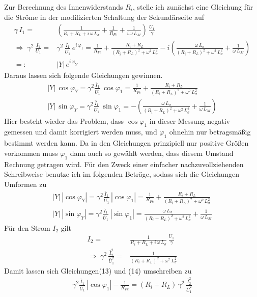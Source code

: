 \documentclass[a4paper, 12pt,]{scrartcl}
\begin{document}
Zur Berechnung des Innenwiderstands $R_i$, stelle ich zunächst eine Gleichung für die Ströme in der modifizierten Schaltung der Sekundärseite auf
\begin{align*}\gamma\,I_1=&\left(\frac{1}{R_i+R_L+i\,\omega\,L_\sigma}+\frac{1}{R_{Fe}}+\frac{1}{i\,\omega\,L_M}\right)\,\frac{U_1}{\gamma}\\
\Rightarrow\;\gamma^2\,\frac{I_1}{U_1}=&\gamma^2\,\frac{\bar{I}_1}{\bar{U}_1}\,e^{i\,\varphi_1}=\frac{1}{R_{Fe}}+\frac{R_i+R_L}{(R_i+R_L)^2+\omega^2\,L_\sigma^2}-i\left(\frac{\omega\,L_\sigma}{(R_i+R_L)^2+\omega^2\,L_\sigma^2}+\frac{1}{\omega\,L_M}\right)\\=:&|Y|\,e^{i\,\varphi_Y}\end{align*}
Daraus lassen sich folgende Gleichungen gewinnen.
\begin{align*}
|Y|\,\cos\varphi_Y=\gamma^2\frac{\bar{I}_1}{\bar{U}_1}\,\cos\varphi_1=\frac{1}{R_{Fe}}+\frac{R_i+R_L}{(R_i+R_L)^2+\omega^2\,L_\sigma^2}\\
|Y|\,\sin\varphi_Y=\gamma^2\frac{\bar{I}_1}{\bar{U}_1}\,\sin\varphi_1=-\left(\frac{\omega\,L_\sigma}{(R_i+R_L)^2+\omega^2\,L_\sigma^2}+\frac{1}{\omega\,L_M}\right)
\end{align*}
Hier besteht wieder das Problem, dass $\cos\varphi_1$ in dieser Messung negativ gemessen und damit korrigiert werden muss, und $\varphi_1$ ohnehin nur betragsmäßig bestimmt werden kann. Da in den Gleichungen prinzipiell nur positive Größen vorkommen muss $\varphi_1$ dann auch so gewählt werden, dass diesem Umstand Rechnung getragen wird. Für den Zweck einer einfacher nachzuvollziehenden Schreibweise benutze ich im folgenden Beträge, sodass sich die Gleichungen Umformen zu
\begin{align}
|Y|\,|\cos\varphi_Y|=\gamma^2\frac{\bar{I}_1}{\bar{U}_1}\,|\cos\varphi_1|=\frac{1}{R_{Fe}}+\frac{R_i+R_L}{(R_i+R_L)^2+\omega^2\,L_\sigma^2}\\
|Y|\,|\sin\varphi_Y|=\gamma^2\frac{\bar{I}_1}{\bar{U}_1}\,|\sin\varphi_1|=\frac{\omega\,L_\sigma}{(R_i+R_L)^2+\omega^2\,L_\sigma^2}+\frac{1}{\omega\,L_M}
\end{align}
Für den Strom $I_2$ gilt
\begin{align*}I_2=&\frac{1}{R_i+R_L+i\,\omega\,L_\sigma}\,\frac{U_1}{\gamma}\\
\Rightarrow\;\gamma^2\,\frac{\bar{I}_2^2}{\bar{U}_1^2}=&\frac{1}{(R_i+R_L)^2+\omega^2\,L_\sigma^2}
\end{align*}
Damit lassen sich Gleichungen(13) und (14) umschreiben zu
\begin{align*}
\gamma^2\frac{\bar{I}_1}{\bar{U}_1}\,|\cos\varphi_1|-\frac{1}{R_{Fe}}=(R_i+R_L)\,\gamma^2\,\frac{\bar{I}_2^2}{\bar{U}_1^2}
\end{align*}
\end{document}
